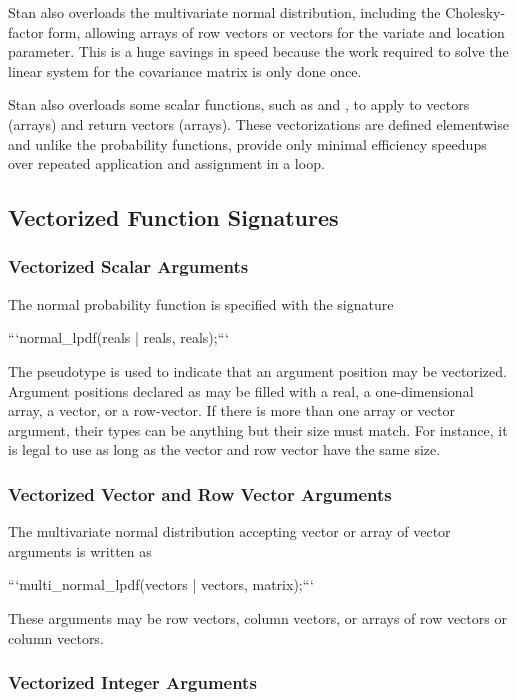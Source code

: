\begin{description}
{\begin{description}
Stan also overloads the multivariate normal distribution, including the Cholesky-factor form, allowing arrays of row vectors or vectors for the variate and location parameter.  This is a huge savings in speed because the work required to solve the linear system for the covariance matrix is only done once.


Stan also overloads some scalar functions, such as  and , to apply to vectors (arrays) and return vectors (arrays). These vectorizations are defined elementwise and unlike the probability functions, provide only minimal efficiency speedups over repeated application and assignment in a loop.


\subsection{Vectorized Function Signatures}\label{prob-vectorization.section}


\subsubsection{Vectorized Scalar Arguments}


The normal probability function is specified with the signature


```\n normal_lpdf(reals | reals, reals);\n ```


The pseudotype  is used to indicate that an argument position may be vectorized.  Argument positions declared as  may be filled with a real, a one-dimensional array, a vector, or a row-vector.  If there is more than one array or vector argument, their types can be anything but their size must match.  For instance, it is legal to use  as long as the vector and row vector have the same size.


\subsubsection{Vectorized Vector and Row Vector Arguments}


The multivariate normal distribution accepting vector or array of vector arguments is written as


```\n multi_normal_lpdf(vectors | vectors, matrix);\n ```


These arguments may be row vectors, column vectors, or arrays of row vectors or column vectors.


\subsubsection{Vectorized Integer Arguments}



\end{description}}
\end{description}

